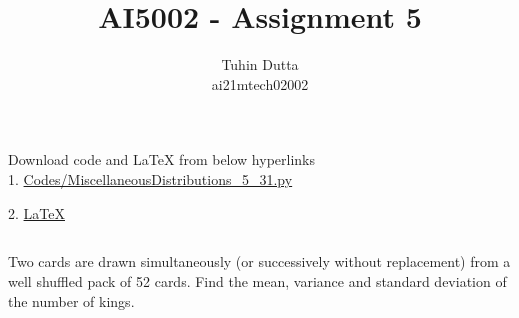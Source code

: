 \documentclass[journal,12pt,twocolumn]{IEEEtran}
\begin{document}
\providecommand{\mtx}[1]{\mathbf{#1}}
\providecommand{\fourier}{\overset{\mathcal{F}}{ \rightleftharpoons}}
\providecommand{\system}{\overset{\mathcal{H}}{ \longleftrightarrow}}
\newcommand{\solution}{\noindent \textbf{Solution: }}
\newcommand{\cosec}{\,\text{cosec}\,}
\providecommand{\dec}[2]{\ensuremath{\overset{#1}{\underset{#2}{\gtrless}}}}
\newcommand{\myvec}[1]{\ensuremath{\begin{pmatrix}#1\end{pmatrix}}}
\newcommand{\mydet}[1]{\ensuremath{\begin{vmatrix}#1\end{vmatrix}}}
\makeatletter
{}
\makeatother
\let\StandardTheFigure\thefigure
\let\vec\mathbf
\renewcommand{\thefigure}{\theproblem}
\def\putbox#1#2#3{\makebox[0in][l]{\makebox[#1][l]{}\raisebox{\baselineskip}[0in][0in]{\raisebox{#2}[0in][0in]{#3}}}}
     \def\rightbox#1{\makebox[0in][r]{#1}}
     \def\centbox#1{\makebox[0in]{#1}}
     \def\topbox#1{\raisebox{-\baselineskip}[0in][0in]{#1}}
     \def\midbox#1{\raisebox{-0.5\baselineskip}[0in][0in]{#1}}
\vspace{3cm}
\title{AI5002 - Assignment 5}
\author{Tuhin Dutta\\ ai21mtech02002}
\maketitle
\newpage
\bigskip
\renewcommand{\thefigure}{\theenumi}
\renewcommand{\thetable}{\theenumi}
\begin{mdframed}
Download code and LaTeX from below hyperlinks\\
1. \href{https://github.com/Tauhait/AI5002/blob/main/Assignment-5/Codes/MiscellaneousDistributions\_5\_31.py}{Codes/MiscellaneousDistributions\_5\_31.py}


2. \href{https://github.com/Tauhait/AI5002/tree/main/Assignment-5/LaTeX}{LaTeX}
\end{mdframed}
\subsection*{}
\begin{flushleft}Two cards are drawn simultaneously (or
successively without replacement) from a well
shuffled pack of 52 cards. Find the mean,
variance and standard deviation of the number
of kings.\end{flushleft}
\end{document}
